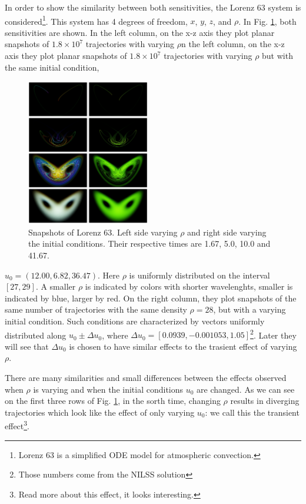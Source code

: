 \documentclass[10pt,twoside,a4paper]{article} %
\begin{document}
In order to show the similarity between both sensitivities, the Lorenz 63 system is considered\footnote{Lorenz 63 is a simplified ODE model for atmospheric convection.}. This system has 4 degrees of freedom, $x$, $y$, $z$, and $\rho$. In Fig. \ref{fig:lz63}, both sensitivities are shown. In the left column, on the x-z axis they plot planar snapshots of $1.8\times10^7$ trajectories with varying $\rho$n the left column, on the x-z axis they plot planar snapshots of $1.8\times10^7$ trajectories with varying $\rho$ but with the same initial condition,
\begin{figure} %
  \begin{center}
    \includegraphics[width=0.48\textwidth]{lz63.png}
  \end{center}
  \caption{Snapshots of Lorenz 63. Left side varying $\rho$ and right side varying the initial conditions. Their respective times are 1.67, 5.0, 10.0 and 41.67.}
  \label{fig:lz63}
\end{figure}
$u_0 = (12.00, 6.82, 36.47)$. Here $\rho$ is uniformly distributed on the interval $[27,29]$. A smaller $\rho$ is indicated by colors with shorter wavelenghts, smaller is indicated by blue, larger by red. On the right column, they plot snapshots of the same number of trajectories with the same density $\rho = 28$, but with a varying initial condition. Such conditions are characterized by vectors uniformly distributed along $u_0 \pm \Delta u_0$, where $\Delta u_0 = [0.0939,-0.001053,1.05]$\footnote{Those numbers come from the NILSS solution}. Later they will see that $\Delta u_0$ is chosen to have similar effects to the trasient effect of varying $\rho$.

There are many similarities and small differences between the effects observed when $\rho$ is varying and when the initial conditions $u_0$ are changed. As we can see on the first three rows of Fig. \ref{fig:lz63}, in the sorth time, changing $\rho$ results in diverging trajectories which look like the effect of only varying $u_0$: we call this the transient effect\footnote{Read more about this effect, it looks interesting.}.
\end{document}
